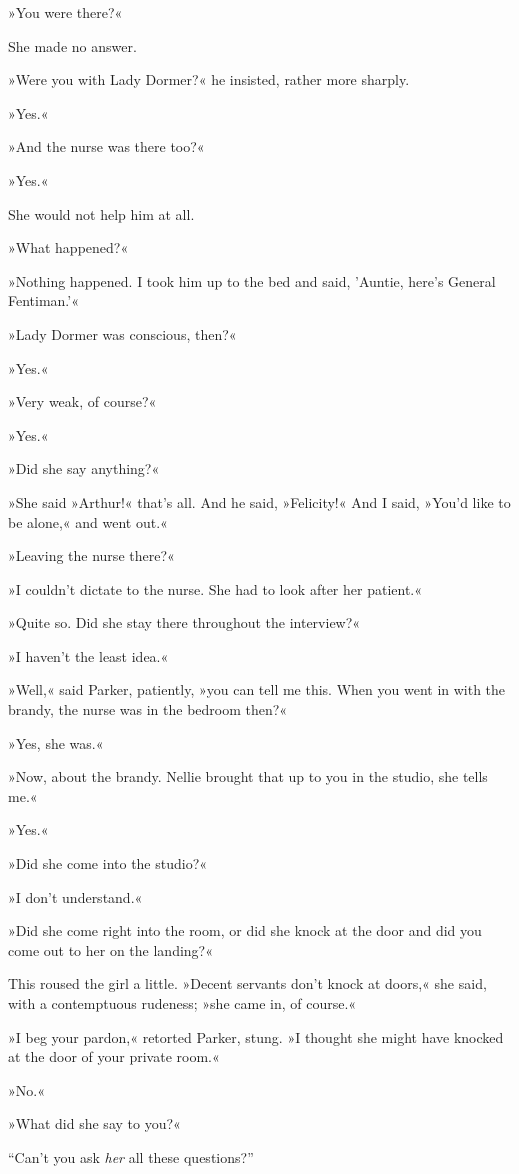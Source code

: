 »You were there?«

She made no answer.

»Were you with Lady Dormer?« he insisted, rather more sharply.

»Yes.«

»And the nurse was there too?«

»Yes.«

She would not help him at all.

»What happened?«

»Nothing happened. I took him up to the bed and said, 'Auntie, here's General Fentiman.'«

»Lady Dormer was conscious, then?«

»Yes.«

»Very weak, of course?«

»Yes.«

»Did she say anything?«

»She said »Arthur!« that's all. And he said, »Felicity!« And I said, »You'd like to be alone,« and went out.«

»Leaving the nurse there?«

»I couldn't dictate to the nurse. She had to look after her patient.«

»Quite so. Did she stay there throughout the interview?«

»I haven't the least idea.«

»Well,« said Parker, patiently, »you can tell me this. When you went in with the brandy, the nurse was in the bedroom then?«

»Yes, she was.«

»Now, about the brandy. Nellie brought that up to you in the studio, she tells me.«

»Yes.«

»Did she come into the studio?«

»I don't understand.«

»Did she come right into the room, or did she knock at the door and did you come out to her on the landing?«

This roused the girl a little. »Decent servants don't knock at doors,« she said, with a contemptuous rudeness; »she came in, of course.«

»I beg your pardon,« retorted Parker, stung. »I thought she might have knocked at the door of your private room.«

»No.«

»What did she say to you?«

\enquote{Can't you ask \textit{her} all these questions?}

